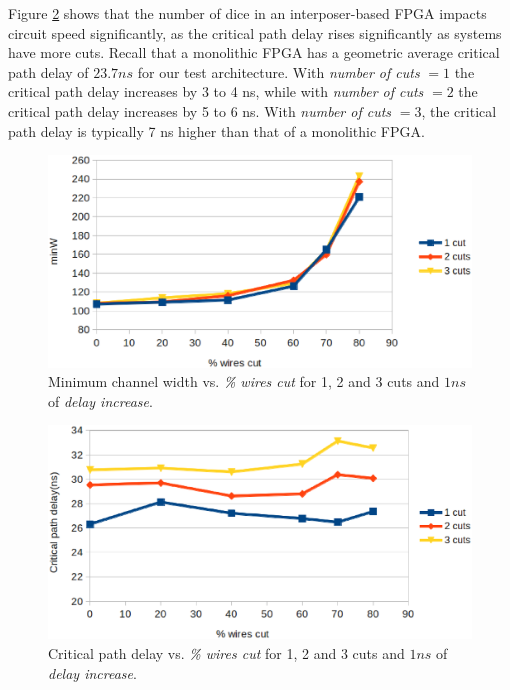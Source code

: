 \documentclass{sig-alternate-2013}
\begin{document}
Figure \ref{fig:cuts_crit} shows that the number of dice in an interposer-based FPGA impacts circuit speed significantly, as the critical path delay rises significantly as systems have more cuts. Recall that a monolithic FPGA has a geometric average critical path delay of $23.7ns$ for our test architecture. With \textit{number of cuts} $= 1$ the critical path delay increases by 3 to 4 ns, while with \textit{number of cuts} $= 2$ the critical path delay increases by 5 to 6 ns. With \textit{number of cuts} $= 3$, the critical path delay is typically 7 ns higher than that of a monolithic FPGA.

\begin{figure}[!htbp]
\centering
\includegraphics[width=\linewidth]{cuts_minW.eps}
\caption{Minimum channel width vs. \textit{\% wires cut} for 1, 2 and 3 cuts and $1ns$ of \textit{delay increase}.}
\label{fig:cuts_minW}
\end{figure}

\begin{figure}[!htbp]
\centering
\includegraphics[width=\linewidth]{cuts_crit_path.eps}
\caption{Critical path delay vs. \textit{\% wires cut} for 1, 2 and 3 cuts and $1ns$ of \textit{delay increase}.}
\label{fig:cuts_crit}
\end{figure}
\end{document}
